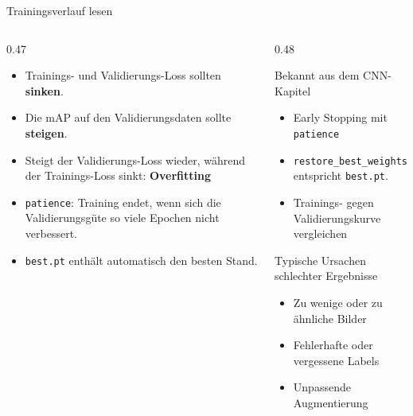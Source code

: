 \begin{frame}{Trainingsverlauf lesen}
\footnotesize
{}
\begin{columns}
\begin{column}{0.47\textwidth}
\begin{itemize}
  \item Trainings- und Validierungs-Loss sollten \textbf{sinken}.
  \item Die mAP auf den Validierungsdaten sollte \textbf{steigen}.
  \item Steigt der Validierungs-Loss wieder, während der Trainings-Loss sinkt: \textbf{Overfitting}
  \item \texttt{patience}: Training endet, wenn sich die Validierungsgüte so viele Epochen nicht verbessert.
  \item \texttt{best.pt} enthält automatisch den besten Stand.
\end{itemize}
\end{column}
\begin{column}{0.48\textwidth}
\begin{blockC1}{Bekannt aus dem CNN-Kapitel}
\begin{itemize}
  \item Early Stopping mit \texttt{patience}
  \item \texttt{restore\_best\_weights} entspricht \texttt{best.pt}.
  \item Trainings- gegen Validierungskurve vergleichen
\end{itemize}
\end{blockC1}
\begin{blockC2}{Typische Ursachen schlechter Ergebnisse}
\begin{itemize}
  \item Zu wenige oder zu ähnliche Bilder
  \item Fehlerhafte oder vergessene Labels
  \item Unpassende Augmentierung
\end{itemize}
\end{blockC2}
\end{column}
\end{columns}
\end{frame}

